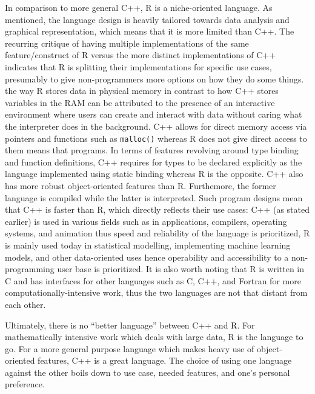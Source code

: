 \documentclass[12pt]{article}
\begin{document}
In comparison to more general C++, R is a niche-oriented language. As mentioned, the language design is heavily tailored towards data analysis and graphical representation, which means that it is more limited than C++. The recurring critique of having multiple implementations of the same feature/construct of R versus the more distinct implementations of C++ indicates that R is splitting their implementations for specific use cases, presumably to give non-programmers more options on how they do some things. the way R stores data in physical memory in contrast to how C++ stores variables in the RAM can be attributed to the presence of an interactive environment where users can create and interact with data without caring what the interpreter does in the background. C++ allows for direct memory access via pointers and functions such as \texttt{malloc()} whereas R does not give direct access to them means that programs. In terms of features revolving around type binding and function definitions, C++ requires for types to be declared explicitly as the language implemented using static binding whereas R is the opposite. C++ also has more robust object-oriented features than R. Furthemore, the former language is compiled while the latter is interpreted. Such program designs mean that C++ is faster than R, which directly reflects their use cases: C++ (as stated earlier) is used in various fields such as in applications, compilers, operating systems, and animation thus speed and reliability of the language is prioritized, R is mainly used today in statistical modelling, implementing machine learning models, and other data-oriented uses hence operability and accessibility to a non-programming user base is prioritized. It is also worth noting that R is written in C and has interfaces for other languages such as C, C++, and Fortran for more computationally-intensive work, thus the two languages are not that distant from each other.

Ultimately, there is no ``better language'' between C++ and R. For mathematically intensive work which deals with large data, R is the language to go. For a more general purpose language which makes heavy use of object-oriented features, C++ is a great language. The choice of using one language against the other boils down to use case, needed features, and one's personal preference.
\end{document}
